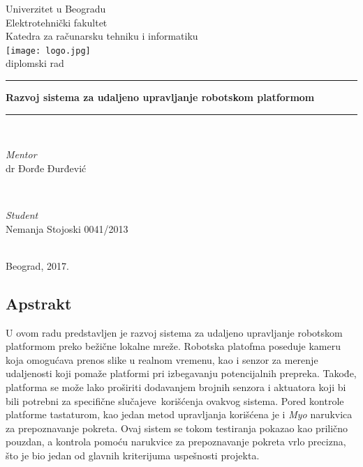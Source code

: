 \documentclass[12pt,a4paper]{report}
\begin{document}
\begin{titlepage}

\centering
\textnormal{\Large Univerzitet u Beogradu}\\[0.3cm]
\textnormal{\Large Elektrotehnički fakultet}\\[0.1cm]
\textnormal{\Large Katedra za računarsku tehniku i informatiku}\\[1.5cm]

\texttt{[image: logo.jpg]}\\[4cm]

\textnormal{\LARGE diplomski rad}\\[-4mm]
\rule{\textwidth}{0.4pt}
{\Huge \bfseries Razvoj sistema za udaljeno upravljanje robotskom platformom \par}
\rule{\textwidth}{0.4pt}\\[4cm]


\begin{minipage}{0.4\textwidth}
\begin{flushleft} \large
\emph{\large Mentor}\\
dr Đorđe Đurđević\\
\end{flushleft}
\end{minipage}
~
\begin{minipage}{0.4\textwidth}
\begin{flushright} \large
\emph{\large Student} \\
Nemanja Stojoski 0041/2013
\end{flushright}
\end{minipage}\\[2cm]
\vfill
\textnormal{\normalsize Beograd, 2017.}\\

\end{titlepage}

\begin{center}
\section*{Apstrakt}
\end{center}
U ovom radu predstavljen je razvoj sistema za udaljeno upravljanje robotskom platformom preko bežične lokalne mreže. Robotska platofma poseduje kameru koja omogućava prenos slike u realnom vremenu, kao i senzor za merenje udaljenosti koji pomaže platformi pri izbegavanju potencijalnih prepreka. Takođe, platforma se može  lako proširiti dodavanjem brojnih senzora i aktuatora koji bi bili potrebni za specifične slučajeve\ korišćenja ovakvog sistema. Pored kontrole platforme tastaturom, kao jedan metod upravljanja korišćena je i \textit{Myo} narukvica za prepoznavanje pokreta. Ovaj sistem se tokom testiranja pokazao kao prilično pouzdan, a kontrola pomoću narukvice za prepoznavanje pokreta vrlo precizna, što je bio jedan od glavnih kriterijuma uspešnosti projekta.
\end{document}
